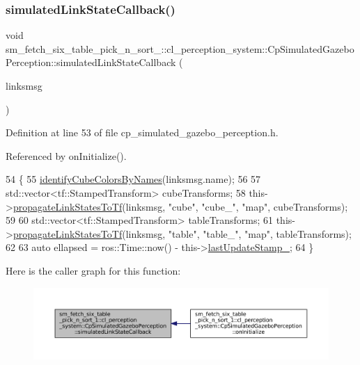 \subsubsection{\texorpdfstring{simulated\+Link\+State\+Callback()}{simulatedLinkStateCallback()}}
{\footnotesize\ttfamily void sm\+\_\+fetch\+\_\+six\+\_\+table\+\_\+pick\+\_\+n\+\_\+sort\+\_\+::cl\+\_\+perception\+\_\+system\+::\+Cp\+Simulated\+Gazebo\+Perception\+::simulated\+Link\+State\+Callback (\begin{DoxyParamCaption}\item[{const gazebo\+\_\+msgs\+::\+Link\+States \&}]{linksmsg }\end{DoxyParamCaption})\hspace{0.3cm}{\ttfamily [inline]}}



Definition at line 53 of file cp\+\_\+simulated\+\_\+gazebo\+\_\+perception.\+h.



Referenced by on\+Initialize().


\begin{DoxyCode}
54             \{
55                 \hyperlink{classsm__fetch__six__table__pick__n__sort__1_1_1cl__perception__system_1_1CpSimulatedGazeboPerception_a072f6dd3a13d410172c8d3136314ab1a}{identifyCubeColorsByNames}(linksmsg.name);
56 
57                 std::vector<tf::StampedTransform> cubeTransforms;
58                 this->\hyperlink{classsm__fetch__six__table__pick__n__sort__1_1_1cl__perception__system_1_1CpSimulatedGazeboPerception_a40276b12f8e7993a30428cea7cf3a302}{propagateLinkStatesToTf}(linksmsg, \textcolor{stringliteral}{"cube"}, \textcolor{stringliteral}{"cube\_"}, \textcolor{stringliteral}{"map"}, 
      cubeTransforms);
59 
60                 std::vector<tf::StampedTransform> tableTransforms;
61                 this->\hyperlink{classsm__fetch__six__table__pick__n__sort__1_1_1cl__perception__system_1_1CpSimulatedGazeboPerception_a40276b12f8e7993a30428cea7cf3a302}{propagateLinkStatesToTf}(linksmsg, \textcolor{stringliteral}{"table"}, \textcolor{stringliteral}{"table\_"}, \textcolor{stringliteral}{"map"}, 
      tableTransforms);
62 
63                 \textcolor{keyword}{auto} ellapsed = ros::Time::now() - this->\hyperlink{classsm__fetch__six__table__pick__n__sort__1_1_1cl__perception__system_1_1CpSimulatedGazeboPerception_a0afb429015393558ba3f7c514da6652c}{lastUpdateStamp\_};
64             \}
\end{DoxyCode}
Here is the caller graph for this function\+:
\nopagebreak
\begin{figure}[H]
\begin{center}
\leavevmode
\includegraphics[width=350pt]{classsm__fetch__six__table__pick__n__sort__1_1_1cl__perception__system_1_1CpSimulatedGazeboPerception_a8423ebb530a05ca9fc660a3d77676dbb_icgraph}
\end{center}
\end{figure}



